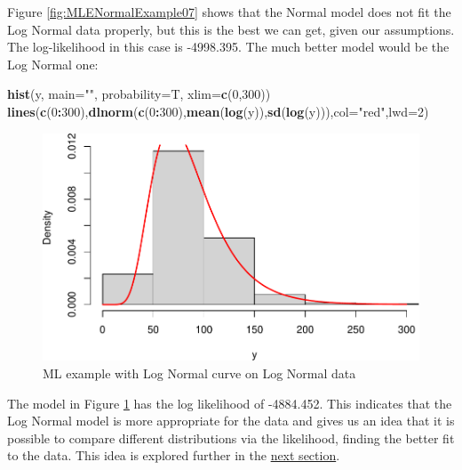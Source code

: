 \documentclass[
]{book}
\newenvironment{Shaded}{\begin{snugshade}}{\end{snugshade}}
\newcommand{\AttributeTok}[1]{\textcolor[rgb]{0.13,0.29,0.53}{#1}}
\newcommand{\DecValTok}[1]{\textcolor[rgb]{0.00,0.00,0.81}{#1}}
\newcommand{\FunctionTok}[1]{\textcolor[rgb]{0.13,0.29,0.53}{\textbf{#1}}}
\newcommand{\NormalTok}[1]{#1}
\newcommand{\SpecialCharTok}[1]{\textcolor[rgb]{0.81,0.36,0.00}{\textbf{#1}}}
\newcommand{\StringTok}[1]{\textcolor[rgb]{0.31,0.60,0.02}{#1}}
\theoremstyle{definition}
\theoremstyle{definition}
\theoremstyle{definition}
\theoremstyle{definition}
\theoremstyle{remark}
\begin{document}
Figure \ref{fig:MLENormalExample07} shows that the Normal model does not fit the Log Normal data properly, but this is the best we can get, given our assumptions. The log-likelihood in this case is -4998.395. The much better model would be the Log Normal one:

\begin{Shaded}
\begin{Highlighting}[]
\FunctionTok{hist}\NormalTok{(y, }\AttributeTok{main=}\StringTok{""}\NormalTok{, }\AttributeTok{probability=}\NormalTok{T, }\AttributeTok{xlim=}\FunctionTok{c}\NormalTok{(}\DecValTok{0}\NormalTok{,}\DecValTok{300}\NormalTok{))}
\FunctionTok{lines}\NormalTok{(}\FunctionTok{c}\NormalTok{(}\DecValTok{0}\SpecialCharTok{:}\DecValTok{300}\NormalTok{),}\FunctionTok{dlnorm}\NormalTok{(}\FunctionTok{c}\NormalTok{(}\DecValTok{0}\SpecialCharTok{:}\DecValTok{300}\NormalTok{),}\FunctionTok{mean}\NormalTok{(}\FunctionTok{log}\NormalTok{(y)),}\FunctionTok{sd}\NormalTok{(}\FunctionTok{log}\NormalTok{(y))),}\AttributeTok{col=}\StringTok{"red"}\NormalTok{,}\AttributeTok{lwd=}\DecValTok{2}\NormalTok{)}
\end{Highlighting}
\end{Shaded}

\begin{figure}
\centering
\includegraphics{Svetunkov---Statistics-for-Business-Analytics_files/figure-latex/MLENormalExample08-1.pdf}
\caption{\label{fig:MLENormalExample08}ML example with Log Normal curve on Log Normal data}
\end{figure}

The model in Figure \ref{fig:MLENormalExample08} has the log likelihood of -4884.452. This indicates that the Log Normal model is more appropriate for the data and gives us an idea that it is possible to compare different distributions via the likelihood, finding the better fit to the data. This idea is explored further in the \hyperref[modelSelection]{next section}.
\end{document}
